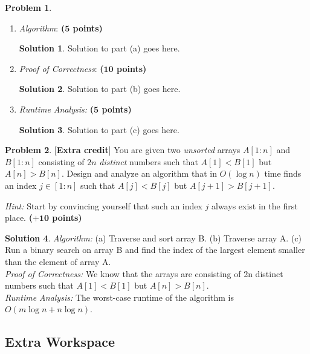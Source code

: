 \documentclass{article}
\theoremstyle{definition}
\newtheorem{problem}{Problem}
\newtheorem*{solution*}{Solution}
\newenvironment{solution}{\begin{solution*}}{{} \end{solution*}}
\newcommand{\grade}[1]{\hfill{\textbf{($\mathbf{#1}$ points)}}}
\begin{document}
\begin{problem}
\begin{itemize}
	\end{itemize}
		
		\begin{enumerate}[label=(\alph*)]
	\item \emph{Algorithm}: \grade{5}
	
	\bigskip
				\begin{solution}
	Solution to part (a) goes here. 
	\end{solution}
	
	
	\newpage
	\item \emph{Proof of Correctness}: \grade{10}
	\bigskip
				\begin{solution}
	Solution to part (b) goes here. 
	\end{solution}
	
	\bigskip
	
	\item \emph{Runtime Analysis:} \grade{5}
	\bigskip
				\begin{solution}
	Solution to part (c) goes here. 
	\end{solution}
	
	
\end{enumerate}

\end{problem}
\newpage

\begin{problem}\label{extra}[\textbf{Extra credit}]
	You are given two \emph{unsorted} arrays $A[1:n]$ and $B[1:n]$ consisting of $2n$ \emph{distinct} numbers such that $A[1] < B[1]$ but $A[n] > B[n]$. Design and analyze an algorithm that in $O(\log{n})$ time 
	finds an index $j \in [1:n]$ such that $A[j] < B[j]$ but $A[j+1] > B[j+1]$. 
	
	\emph{Hint:} Start by convincing yourself that such an index $j$ always exist in the first place. \grade{+10}

\end{problem}

\bigskip

	\begin{solution}

	\emph{Algorithm:} (a) Traverse and sort array B. (b) Traverse array A. (c) Run a binary search on array B and find the index of the largest element smaller than the element of array A. \\
	
	\emph{Proof of Correctness:} We know that the arrays are consisting of 2n distinct numbers such that $A[1] < B[1]$ but $A[n] > B[n]$. \\
	
	\emph{Runtime Analysis:} The worst-case runtime of the algorithm is $O(m\log{n} + n\log{n})$.
	
	\end{solution}
	
\newpage
\subsection*{Extra Workspace}
\end{document}
